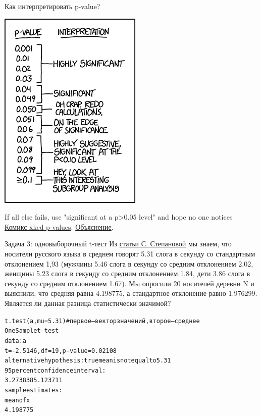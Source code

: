 \begin{frame}{Как интерпретировать p-value?}
\begin{center}
\includegraphics[width=0.45\linewidth]{ifall.png}
\end{center}
\vspace{-5mm}
If all else fails, use "significant at a p>0.05 level" and hope no one notices
\\
\href{https://xkcd.com/1478/}{\alert{Комикс xkcd p-values}}. \href{http://www.explainxkcd.com/wiki/index.php/P-Values}{\alert{Объяснение}}.
\end{frame}
\begin{frame}{Задача 3: одновыборочный t-тест}
Из \href{https://www.internationalphoneticassociation.org/icphs-proceedings/ICPhS2011/OnlineProceedings/RegularSession/Stepanova/Stepanova.pdf}{\alert{статьи С. Степановой}} мы знаем, что носители русского языка в среднем говорят 5.31 слога в секунду со стандартным отклонением 1,93 (мужчины 5.46 слога в секунду  со средним отклонением 2.02, женщины 5.23 слога в секунду  со средним отклонением 1.84, дети 3.86 слога в секунду со средним отклонением 1.67). Мы опросили 20 носителей деревни N и выяснили, что средняя равна 4.198775, а стандартное отклонение равно 1.976299. Является ли данная разница статистически значимой?
\vfill
\scriptsize
\begin{alltt}
\alert{t.test(a, mu = 5.31)} \hfill \# первое — вектор значений, второе — среднее\medskip\\
One Sample t-test\\
data:  a\\
\alert{t = -2.5146, df = 19, p-value = 0.02108}\\
alternative hypothesis: true mean is not equal to 5.31\\
95 percent confidence interval:\\
 3.273838 5.123711\\
sample estimates:\\
mean of x \\
 4.198775 
\end{alltt}
\normalsize
\end{frame}
